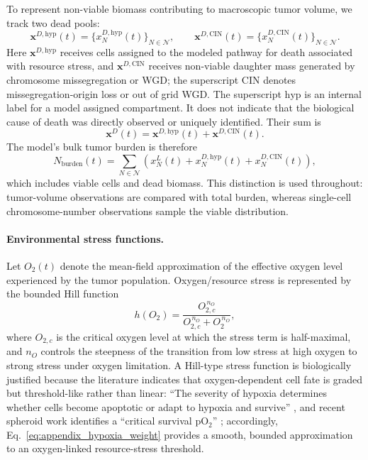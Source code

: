 \documentclass[11pt]{article}
\begin{document}
To represent non-viable biomass contributing to macroscopic tumor volume, we track two dead pools:
\begin{equation}
\mathbf{x}^{D,\mathrm{hyp}}(t)=\{x_{N}^{D,\mathrm{hyp}}(t)\}_{N\in\mathcal N},
\qquad
\mathbf{x}^{D,\mathrm{CIN}}(t)=\{x_{N}^{D,\mathrm{CIN}}(t)\}_{N\in\mathcal N}.
\label{eq:appendix_dead_pools}
\end{equation}
Here $\mathbf{x}^{D,\mathrm{hyp}}$ receives cells assigned to the modeled pathway for death associated with resource stress, and $\mathbf{x}^{D,\mathrm{CIN}}$ receives non-viable daughter mass generated by chromosome missegregation or WGD; the superscript $\mathrm{CIN}$ denotes missegregation-origin loss or out of grid WGD. The superscript $\mathrm{hyp}$ is an internal label for a model assigned compartment. It does not indicate that the biological cause of death was directly observed or uniquely identified. Their sum is
\begin{equation}
\mathbf{x}^{D}(t)=\mathbf{x}^{D,\mathrm{hyp}}(t)+\mathbf{x}^{D,\mathrm{CIN}}(t).
\label{eq:appendix_total_dead_pool}
\end{equation}
The model's bulk tumor burden is therefore
\begin{equation}
N_{\mathrm{burden}}(t)
=
\sum_{N\in\mathcal N}
\left(x_{N}^L(t)+x_{N}^{D,\mathrm{hyp}}(t)+x_{N}^{D,\mathrm{CIN}}(t)\right),
\label{eq:appendix_tumor_burden}
\end{equation}
which includes viable cells and dead biomass. This distinction is used throughout: tumor-volume observations are compared with total burden, whereas single-cell chromosome-number observations sample the viable distribution.

\paragraph{Environmental stress functions.}

Let $O_2(t)$ denote the mean-field approximation of the effective oxygen level experienced by the tumor population. Oxygen/resource stress is represented by the bounded Hill function
\begin{equation}
h(O_2)=\frac{O_{2,c}^{\,n_O}}{O_{2,c}^{\,n_O}+O_2^{\,n_O}},
\label{eq:appendix_hypoxia_weight}
\end{equation}
where $O_{2,c}$ is the critical oxygen level at which the stress term is half-maximal, and $n_O$ controls the steepness of the transition from low stress at high oxygen to strong stress under oxygen limitation. A Hill-type stress function is biologically justified because the literature indicates that oxygen-dependent cell fate is graded but threshold-like rather than linear: ``The severity of hypoxia determines whether cells become apoptotic or adapt to hypoxia and survive'' \cite{greijer_role_2004}, and recent spheroid work identifies a ``critical survival pO$_2$'' \cite{shang_novel_2024}; accordingly, Eq.~\eqref{eq:appendix_hypoxia_weight} provides a smooth, bounded approximation to an oxygen-linked resource-stress threshold.
\end{document}
